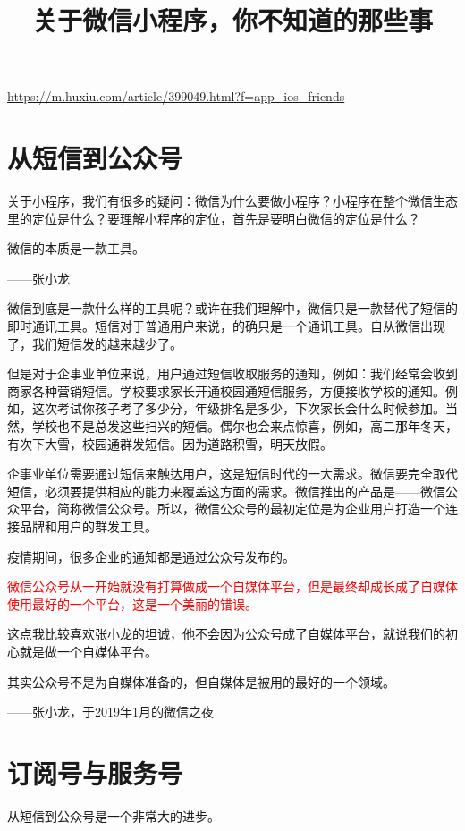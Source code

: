 \documentclass[12pt]{article}
\title{关于微信小程序，你不知道的那些事}
\begin{document}
\maketitle
\tableofcontents


\url{https://m.huxiu.com/article/399049.html?f=app_ios_friends}

\section{从短信到公众号}
关于小程序，我们有很多的疑问：微信为什么要做小程序？小程序在整个微信生态里的定位是什么？要理解小程序的定位，首先是要明白微信的定位是什么？

\begin{framed}
微信的本质是一款工具。

——张小龙
\end{framed}

微信到底是一款什么样的工具呢？或许在我们理解中，微信只是一款替代了短信的即时通讯工具。短信对于普通用户来说，的确只是一个通讯工具。自从微信出现了，我们短信发的越来越少了。

但是对于企事业单位来说，用户通过短信收取服务的通知，例如：我们经常会收到商家各种营销短信。学校要求家长开通校园通短信服务，方便接收学校的通知。例如，这次考试你孩子考了多少分，年级排名是多少，下次家长会什么时候参加。当然，学校也不是总发这些扫兴的短信。偶尔也会来点惊喜，例如，高二那年冬天，有次下大雪，校园通群发短信。因为道路积雪，明天放假。

企事业单位需要通过短信来触达用户，这是短信时代的一大需求。微信要完全取代短信，必须要提供相应的能力来覆盖这方面的需求。微信推出的产品是——微信公众平台，简称微信公众号。所以，微信公众号的最初定位是为企业用户打造一个连接品牌和用户的群发工具。

疫情期间，很多企业的通知都是通过公众号发布的。

\textcolor{red}{微信公众号从一开始就没有打算做成一个自媒体平台，但是最终却成长成了自媒体使用最好的一个平台，这是一个美丽的错误。}

这点我比较喜欢张小龙的坦诚，他不会因为公众号成了自媒体平台，就说我们的初心就是做一个自媒体平台。

\begin{framed}
其实公众号不是为自媒体准备的，但自媒体是被用的最好的一个领域。

——张小龙，于2019年1月的微信之夜
\end{framed}

\section{订阅号与服务号}
从短信到公众号是一个非常大的进步。
\end{document}
